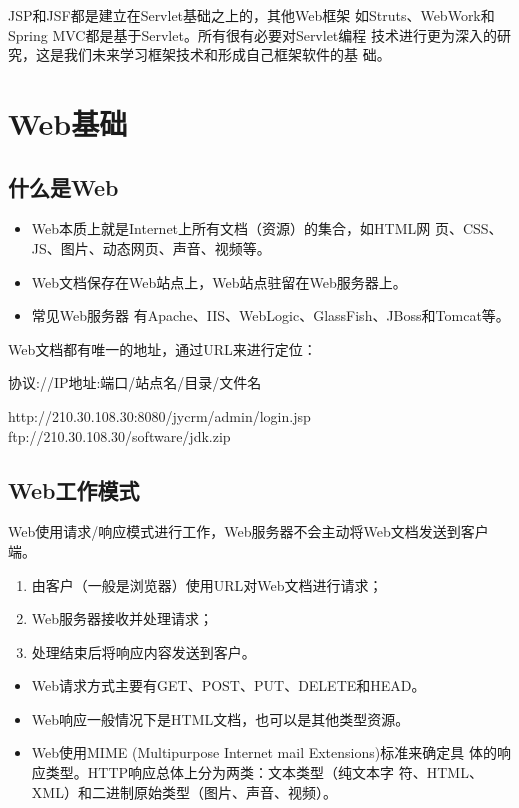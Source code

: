 
JSP和JSF都是建立在Servlet基础之上的，其他Web框架
如Struts、WebWork和Spring MVC都是基于Servlet。所有很有必要对Servlet编程
技术进行更为深入的研究，这是我们未来学习框架技术和形成自己框架软件的基
础。


\section{Web基础}

\subsection{什么是Web}

\begin{itemize}
\item Web本质上就是Internet上所有文档（资源）的集合，如HTML网
  页、CSS、JS、图片、动态网页、声音、视频等。
\item Web文档保存在Web站点上，Web站点驻留在Web服务器上。
\item 常见Web服务器
  有Apache、IIS、WebLogic、GlassFish、JBoss和Tomcat等。
\end{itemize}
Web文档都有唯一的地址，通过URL来进行定位：

{\Blue\kai 协议://IP地址:端口/站点名/目录/文件名}

\begin{javaCode}
  http://210.30.108.30:8080/jycrm/admin/login.jsp
  ftp://210.30.108.30/software/jdk.zip
\end{javaCode}

\subsection{Web工作模式} 

Web使用请求/响应模式进行工作，Web服务器不会主动将Web文档发送到客户端。

\begin{enumerate}\kai
\item 由客户（一般是浏览器）使用URL对Web文档进行请求；
\item Web服务器接收并处理请求；
\item 处理结束后将响应内容发送到客户。
\end{enumerate}

\begin{itemize}
\item Web请求方式主要有{\Red GET、POST}、PUT、DELETE和HEAD。
\item Web响应一般情况下是HTML文档，也可以是其他类型资源。
\item Web使用MIME (Multipurpose Internet mail Extensions)标准来确定具
  体的响应类型。HTTP响应总体上分为两类：文本类型（纯文本字
  符、HTML、XML）和二进制原始类型（图片、声音、视频）。
\end{itemize}

